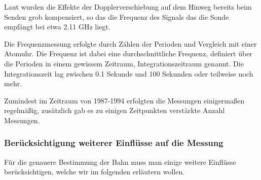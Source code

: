Laut \cite{Markwardt2002} wurden die Effekte der Dopplerverschiebung auf dem Hinweg bereits beim Senden grob kompensiert, so das die Frequenz des Signals das die Sonde empfängt bei etwa 2.11 GHz liegt.

Die Frequenzmessung erfolgte durch Zählen der Perioden und Vergleich mit einer Atomuhr.\cite{Nieto2007} %
Die Frequenz ist dabei eine durchschnittliche Frequenz, definiert über die Perioden in einem gewissem Zeitraum, Integrationszeitraum genannt. Die Integrationszeit lag zwischen 0.1 Sekunde und 100 Sekunden oder teilweise noch mehr.\cite{Markwardt2002}

Zumindest im Zeitraum von 1987-1994 erfolgten die Messungen einigermaßen regelmäßig, zusätzlich gab es zu einigen Zeitpunkten verstärkte Anzahl Messungen.\cite{Markwardt2002} %


\subsubsection{Berücksichtigung weiterer Einflüsse auf die Messung}
Für die genauere Bestimmung der Bahn muss man einige weitere Einflüsse berücksichtigen, welche wir im folgenden erläutern wollen.

